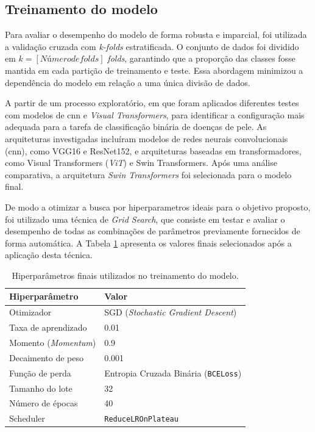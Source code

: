 \subsection{Treinamento do modelo}

Para avaliar o desempenho do modelo de forma robusta e imparcial, foi utilizada a validação cruzada com \textit{k-folds} estratificada. O conjunto de dados foi dividido em \(k= [Número de folds]\) \textit{folds}, garantindo que a proporção das classes fosse mantida em cada partição de treinamento e teste. Essa abordagem minimizou a dependência do modelo em relação a uma única divisão de dados.

A partir de um processo exploratório, em que foram aplicados diferentes testes com modelos de \gls{cnn} e \textit{Visual Transformers}, para identificar a configuração mais adequada para a tarefa de classificação binária de doenças de pele. As arquiteturas investigadas incluíram modelos de redes neurais convolucionais (\gls{cnn}), como VGG16 e ResNet152, e arquiteturas baseadas em transformadores, como Visual Transformers (\textit{ViT}) e Swin Transformers. Após uma análise comparativa, a arquitetura \textit{Swin Transformers} foi selecionada para o modelo final.

De modo a otimizar a busca por hiperparametros ideais para o objetivo proposto, foi utilizado uma técnica de \textit{Grid Search}, que consiste em testar e avaliar o desempenho de todas as combinações de parâmetros previamente fornecidos de forma automática. A Tabela \ref{tab:hiperparametros} apresenta os valores finais selecionados após a aplicação desta técnica.

\begin{table}[h]
    \centering
    \label{tab:hiperparametros}
    \begin{tabular}{ll}
        \toprule
        \textbf{Hiperparâmetro} & \textbf{Valor} \\
        \midrule
        Otimizador              & SGD (\textit{Stochastic Gradient Descent}) \\
        Taxa de aprendizado     & 0.01 \\
        Momento (\textit{Momentum})     & 0.9 \\
        Decaimento de peso      & 0.001 \\
        Função de perda         & Entropia Cruzada Binária (\texttt{BCELoss}) \\
        Tamanho do lote         & 32 \\
        Número de épocas        & 40 \\
        Scheduler               & \texttt{ReduceLROnPlateau} \\
        \bottomrule
    \end{tabular}
    \caption{Hiperparâmetros finais utilizados no treinamento do modelo.}
\end{table}


